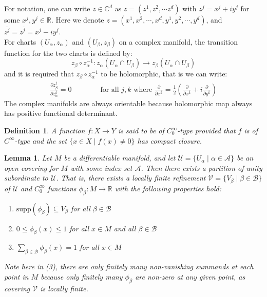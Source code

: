 \documentclass[11pt]{book}
\theoremstyle{break}
\theoremstyle{break}
\newtheorem{lem}{Lemma}[thm]
\newtheorem{defn}{Definition}[corL]
\newcommand{\R}{\mathbb{R}}
\newcommand{\C}{\mathbb{C}}
\newcommand{\pd}{\partial}
\begin{document}
For notation, one can write $z \in \C^d$ as $z = (z^1,z^2,\cdots z^d)$ with $z^j = x^j+iy^j$ for some $x^j,y^j\in \R$. Here we denote $z = (x^1,x^2,\cdots,x^d,y^1,y^2,\cdots,y^d)$, and $\overline{z^{j}} = z^{\bar{j}} = x^j - iy^j$. \\

For charts $(U_\alpha, z_\alpha)$ and $(U_\beta, z_\beta)$ on a complex manifold, the transition function for the two charts is defined by:
$$z_\beta \circ z_\alpha^{-1}:z_\alpha(U_\alpha \cap U_\beta) \to z_\beta(U_\alpha \cap U_\beta)$$ 
and it is required that $z_\beta \circ z_\alpha^{-1}$ to be holomorphic, that is we can write:
\begin{align*}
\frac{\pd z_\beta^j}{\pd z_\alpha^{\bar{k}}} = 0\qquad\qquad \text{for all }j,k \text{ where }\frac{\pd}{\pd x^{\bar{k}}} = \frac{1}{2}\left( \frac{\pd}{\pd x^{\bar{k}}} +i \frac{\pd}{\pd y^{\bar{k}}}\right)
\end{align*}
The complex manifolds are always orientable because holomorphic map always has positive functional determinant.\\

\begin{defn}
A function $f:X\to Y$ is said to be of $C^\infty_0$-type provided that $f$ is of $C^\infty$-type and the set $\{x \in X \mid f(x) \neq 0\}$ has compact closure.
\end{defn}


\begin{lem}
Let $M$ be a differentiable manifold, and let $\mathcal{U} = \{U_\alpha\mid \alpha \in \mathcal{A}\}$ be an open covering for $M$ with some index set $\mathcal{A}$. Then there exists a partition of unity subordinate to $\mathcal{U}$. That is, there exists a locally finite refinement $\mathcal{V} = \{V_\beta\mid \beta\in \mathcal{B}\}$ of $\mathcal{U}$ and $C^\infty_0$ functions $\phi_\beta : M \to \R$ with the following properties hold: 
\begin{enumerate}[topsep=3pt,itemsep=-1ex,partopsep=1ex,parsep=1ex]
\item $\text{supp}(\phi_\beta) \subseteq V_\beta$ for all $\beta \in \mathcal{B}$
\item $0\leq \phi_\beta(x) \leq 1$ for all $x \in M$ and all $\beta \in \mathcal{B}$
\item $\sum_{\beta \in \mathcal{B}}\phi_\beta(x) = 1$ for all $x \in M$
\end{enumerate}  
Note here in (3), there are only finitely many non-vanishing summands at each point in $M$ because only finitely many $\phi_\beta$ are non-zero at any given point, as covering $\mathcal{V}$ is locally finite. 
\end{lem}
\end{document}
